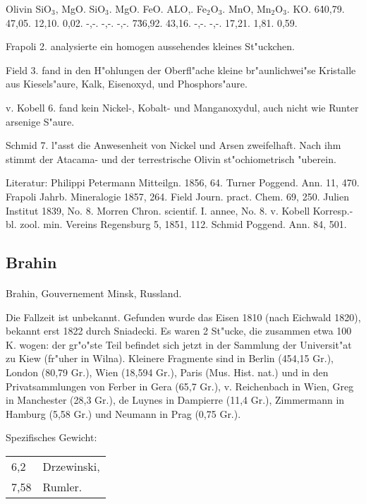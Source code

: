 \documentclass[a4paper, 11pt, oneside]{article}
\begin{document}
Olivin { SiO$_{3}$, MgO. }  
SiO$_{3}$. MgO. FeO. ALO,. Fe$_{2}$O$_{3}$. MnO, Mn$_{2}$O$_{3}$. KO.  
6\. 40,79. 47,05. 12,10. 0,02. -,-. -,-. -,-.  
7\. 36,92. 43,16. -,-. -,-. 17,21. 1,81. 0,59.

Frapoli 2. analysierte ein homogen aussehendes kleines St"uckchen.

Field 3. fand in den H"ohlungen der Oberfl"ache kleine br"aunlichwei"se Kristalle aus Kiesels"aure, Kalk, Eisenoxyd, und Phosphors"aure.

v. Kobell 6. fand kein Nickel-, Kobalt- und Manganoxydul, auch nicht wie Runter arsenige S"aure.

Schmid 7. l"asst die Anwesenheit von Nickel und Arsen zweifelhaft. Nach ihm stimmt der Atacama- und der terrestrische Olivin st"ochiometrisch "uberein.

\footnotesize
Literatur: Philippi Petermann Mitteilgn. 1856, 64. Turner Poggend. Ann. 11, 470. Frapoli Jahrb. Mineralogie 1857, 264. Field Journ. pract. Chem. 69, 250. Julien Institut 1839, No. 8. Morren Chron. scientif. I. annee, No. 8. v. Kobell Korresp.-bl. zool. min. Vereins Regensburg 5, 1851, 112. Schmid Poggend. Ann. 84, 501.

\subsection{Brahin}
\normalsize
\paragraph{}
Brahin, Gouvernement Minsk, Russland.

Die Fallzeit ist unbekannt. Gefunden wurde das Eisen 1810 (nach Eichwald 1820), bekannt erst 1822 durch Sniadecki. Es waren 2 St"ucke, die zusammen etwa 100 K. wogen: der gr"o"ste Teil befindet sich jetzt in der Sammlung der Universit"at zu Kiew (fr"uher in Wilna). Kleinere Fragmente sind in Berlin (454,15 Gr.), London (80,79 Gr.), Wien (18,594 Gr.), Paris (Mus. Hist. nat.) und in den Privatsammlungen von Ferber in Gera (65,7 Gr.), v. Reichenbach in Wien, Greg in Manchester (28,3 Gr.), de Luynes in Dampierre (11,4 Gr.), Zimmermann in Hamburg (5,58 Gr.) und Neumann in Prag (0,75 Gr.).

Spezifisches Gewicht:  
\begin{table}[!ht]
    \centering
    \begin{tabular}{l l}
        6,2 & Drzewinski,\\
        7,58 & Rumler.
    \end{tabular}
\end{table}
\end{document}
